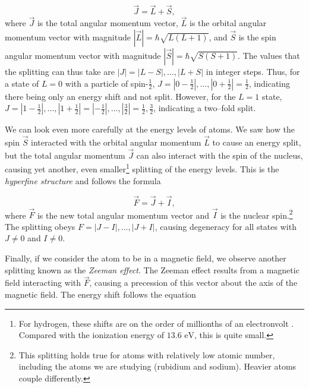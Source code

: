 \begin{equation}
  \vec J = \vec L + \vec S,
  \label{fineequation}
\end{equation}
%
where $\vec J$ is the total angular momentum vector, $\vec L$ is the orbital angular momentum vector with magnitude $|\vec L| = \hbar \sqrt{L (L + 1)}$, and $\vec S$ is the spin angular momentum vector with magnitude $|\vec S| = \hbar \sqrt{S(S+1)}$. The values that the splitting can thus take are $|J| = |L - S|, \dots, |L +S|$ in integer steps. Thus, for a state of $L=0$ with a particle of spin-$\frac{1}{2}$, $J = |0-\frac{1}{2}|, \dots, |0+\frac{1}{2}| = \frac{1}{2}$, indicating there being only an energy shift and not split. However, for the $L=1$ state, $J = |1-\frac{1}{2}|,\dots, |1+\frac{1}{2}| = |-\frac{1}{2}|, \dots, |\frac{3}{2}| =  \frac{1}{2}, \frac{3}{2}$, indicating a two--fold split.


We can look even more carefully at the energy levels of atoms. We saw how the spin $\vec S$ interacted with the orbital angular momentum $\vec L$ to cause an energy split, but the total angular momentum $\vec J$ can also interact with the spin of the nucleus, causing yet another, even smaller\footnote{For hydrogen, these shifts are on the order of millionths of an electronvolt \cite{feynman}. Compared with the ionization energy of $13.6 \text{ eV}$, this is quite small.} splitting of the energy levels. This is the \textit{hyperfine structure} and follows the formula

\begin{equation}
\vec F = \vec J + \vec I,
  \label{hyperfine}
\end{equation}
%
where $\vec F$ is the new total angular momentum vector and $\vec I$ is the nuclear spin.\footnote{This splitting holds true for atoms with relatively low atomic number, including the atoms we are studying (rubidium and sodium). Heavier atoms couple differently.} The splitting obeys $F = |J-I|, \dots, |J+I|$, causing degeneracy for all states with $J \neq 0$ and $I \neq 0$.

Finally, if we consider the atom to be in a magnetic field, we observe another splitting known as the \textit{Zeeman effect}. The Zeeman effect results from a magnetic field interacting with $\vec F$, causing a precession of this vector about the axis of the magnetic field. The energy shift follows the equation

